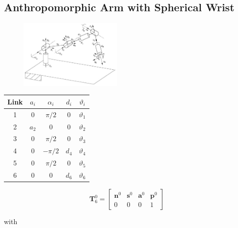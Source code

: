 \documentclass[10pt]{article}
\begin{document}
\subsection{Anthropomorphic Arm with Spherical Wrist}


\begin{figure}[H]
    \centering
    \includegraphics[max width=0.45\textwidth]{./kinematics/anthropomorphic_manipulator}
    \label{c1.l2.fig.anthropomorphic-wrist}
\end{figure}


\begin{table}[H]
    \centering
\begin{tabular}{ccccc}
\hline
Link & $a_{i}$ & $\alpha_{i}$ & $d_{i}$ & $\vartheta_{i}$ \\
\hline
1 & 0 & $\pi / 2$ & 0 & $\vartheta_{1}$ \\
2 & $a_{2}$ & 0 & 0 & $\vartheta_{2}$ \\
3 & 0 & $\pi / 2$ & 0 & $\vartheta_{3}$ \\
4 & 0 & $-\pi / 2$ & $d_{4}$ & $\vartheta_{4}$ \\
5 & 0 & $\pi / 2$ & 0 & $\vartheta_{5}$ \\
6 & 0 & 0 & $d_{6}$ & $\vartheta_{6}$ \\
\hline
\end{tabular}
\end{table}

\noindent
$$
\boldsymbol{T}_{6}^{0}=\left[\begin{array}{cccc}
\boldsymbol{n}^{0} & \boldsymbol{s}^{0} & \boldsymbol{a}^{0} & \boldsymbol{p}^{0} \\
0 & 0 & 0 & 1
\end{array}\right]
$$

with
\end{document}
